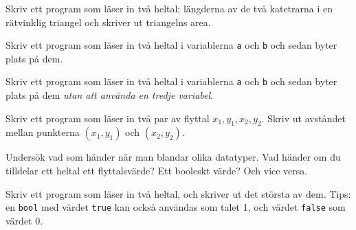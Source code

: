 \begin{exercise}
Skriv ett program som läser in två heltal; längderna av de två katetrarna i en rätvinklig triangel och skriver ut triangelns area.
\end{exercise}
\begin{exercise}
Skriv ett program som läser in två heltal i variablerna \texttt{a} och \texttt{b} och sedan byter plats på dem.
\end{exercise}
\begin{exercise}
Skriv ett program som läser in två heltal i variablerna \texttt{a} och \texttt{b} och sedan byter plats på dem \emph{utan att använda en tredje variabel}.
\end{exercise}
\begin{exercise}
Skriv ett program som läser in två par av flyttal $x_1, y_1, x_2, y_2$. Skriv ut avståndet mellan punkterna $(x_1, y_1)$ och $(x_2, y_2)$.
\end{exercise}
\begin{exercise}
Undersök vad som händer när man blandar olika datatyper. Vad händer om du tilldelar ett heltal ett flyttalsvärde? Ett booleskt värde? Och vice versa.
\end{exercise}
\begin{exercise}
Skriv ett program som läser in två heltal, och skriver ut det största av dem. Tips: en \texttt{bool} med värdet \texttt{true} kan också användas som talet 1, och värdet \texttt{false} som värdet 0.
\end{exercise}